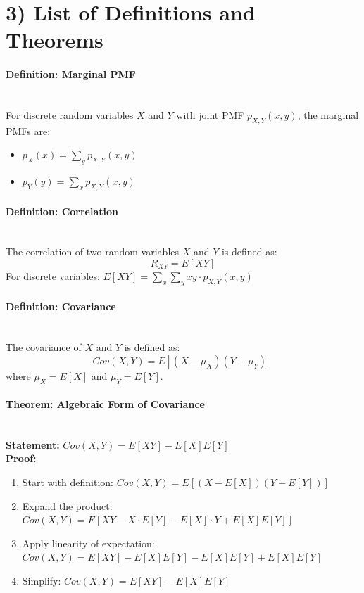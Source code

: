 \documentclass[11pt]{article}
\begin{document}
\vspace{0.3 cm}

\section*{3) List of Definitions and Theorems} 

\paragraph{Definition: Marginal PMF} \leavevmode \\
For discrete random variables $X$ and $Y$ with joint PMF $p_{X,Y}(x,y)$, the marginal PMFs are:
\begin{itemize}
    \item $p_X(x) = \sum_y p_{X,Y}(x,y)$
    \item $p_Y(y) = \sum_x p_{X,Y}(x,y)$
\end{itemize}

\vspace{0.1 cm}

\paragraph{Definition: Correlation} \leavevmode \\
The correlation of two random variables $X$ and $Y$ is defined as:
\[ R_{XY} = E[XY] \]
For discrete variables: $E[XY] = \sum_x \sum_y xy \cdot p_{X,Y}(x,y)$

\vspace{0.1 cm}

\paragraph{Definition: Covariance} \leavevmode \\
The covariance of $X$ and $Y$ is defined as:
\[ Cov(X,Y) = E[(X - \mu_X)(Y - \mu_Y)] \]
where $\mu_X = E[X]$ and $\mu_Y = E[Y]$.

\vspace{0.1 cm}

\paragraph{Theorem: Algebraic Form of Covariance} \leavevmode \\
\textbf{Statement:} $Cov(X,Y) = E[XY] - E[X]E[Y]$ \\
\textbf{Proof:}
\begin{enumerate}
    \item Start with definition: $Cov(X,Y) = E[(X - E[X])(Y - E[Y])]$
    \item Expand the product: $Cov(X,Y) = E[XY - X \cdot E[Y] - E[X] \cdot Y + E[X]E[Y]]$
    \item Apply linearity of expectation: $Cov(X,Y) = E[XY] - E[X]E[Y] - E[X]E[Y] + E[X]E[Y]$
    \item Simplify: $Cov(X,Y) = E[XY] - E[X]E[Y]$
\end{enumerate}
\end{document}
